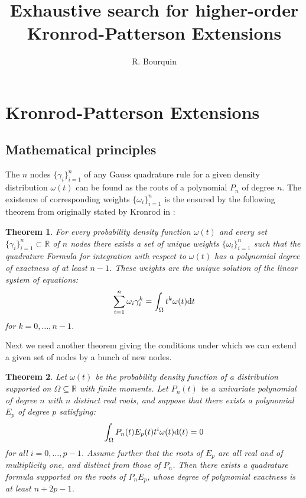 \documentclass[a4paper,10pt]{article}
\title{Exhaustive search for higher-order Kronrod-Patterson Extensions}
\author{R. Bourquin}
\newtheorem{theorem}{Theorem}
\begin{document}
\maketitle

\section{Kronrod-Patterson Extensions}

\subsection{Mathematical principles}

The $n$ nodes $\{\gamma_i\}_{i=1}^{n}$ of any Gauss quadrature rule for a
given density distribution $\omega(t)$ can be found as the roots of a
polynomial $P_n$ of degree $n$. The existence of corresponding weights
$\{\omega_i\}_{i=1}^{n}$ is the ensured by the following theorem from
\cite{mehrotra-papp} originally stated by Kronrod in \cite{kronrod}:

\begin{theorem}
  \label{th:existence_weights}
  For every probability density function $\omega(t)$ and every set
  $\{\gamma_i\}_{i=1}^{n} \subset \mathbb{R}$ of $n$ nodes there exists
  a set of unique weights $\{\omega_i\}_{i=1}^{n}$ such that the quadrature
  Formula for integration with respect to $\omega(t)$ has a polynomial
  degree of exactness of at least $n-1$. These weights are the unique solution
  of the linear system of equations:
  \begin{equation}
    \label{eq:linsys_for_weights}
    \sum_{i=1}^n \omega_i \gamma_i^k = \int_{\Omega} t^k \omega(t) \mathrm{d}t
  \end{equation}
  for $k = 0, \ldots, n-1$.
\end{theorem}

Next we need another theorem giving the conditions under which we can
extend a given set of nodes by a bunch of new nodes.

\begin{theorem}
  \label{th:defining_extension}
  Let $\omega(t)$ be the probability density function of a distribution
  supported on $\Omega \subseteq \mathbb{R}$ with finite moments. Let $P_n(t)$
  be a univariate polynomial of degree $n$ with $n$ distinct real roots,
  and suppose that there exists a polynomial $E_p$ of degree $p$ satisfying:
  \begin{equation}
    \label{eq:defining_extension}
    \int_\Omega P_n(t) E_p(t) t^i \omega(t) \mathrm{d}(t) = 0
  \end{equation}
  for all $i = 0, \ldots, p-1$. Assume further that the roots of $E_p$
  are all real and of multiplicity one, and distinct from
  those of $P_n$. Then there exists a quadrature formula supported on the
  roots of $P_n E_p$, whose degree of polynomial exactness is at least
  $n + 2p -1$.
\end{theorem}
\end{document}
